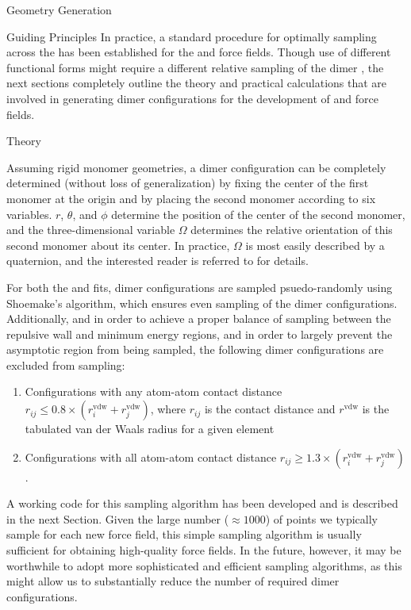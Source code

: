 \begin{section}{Geometry Generation}
\begin{subsection}{Guiding Principles}
In practice, a standard procedure for optimally sampling across the
\pes has been established for the \isaffold
and \mastiff force fields. Though use of different functional forms might
require a different relative sampling of the dimer \pes, the next sections completely outline the
theory and practical calculations that are involved in generating dimer
configurations for the development of \isaffold and \mastiff force fields.

\end{subsection}
\begin{subsection}{Theory}

Assuming rigid monomer geometries, a dimer configuration can be completely
determined (without loss of generalization) by fixing the center of the first monomer at the
origin and by placing the second monomer according to six variables. $r$, $\theta$, and $\phi$ determine the position
of the center of the second monomer, and the three-dimensional variable $\Omega$ determines the relative
orientation of this second monomer about its center. In practice, $\Omega$ is
most easily described by a quaternion, and the interested reader is referred
to  for details.

For both the \isaffold and \mastiff fits, dimer configurations are sampled
psuedo-randomly using Shoemake's algorithm,\cite{Shoemake1992} which ensures
even sampling of the dimer configurations. 
Additionally, and
in order to achieve a proper balance of sampling between the
repulsive wall and minimum energy regions, and in order to largely prevent
the asymptotic region from being sampled, the following dimer configurations
are excluded from sampling:
\begin{enumerate}
\item Configurations with any atom-atom contact distance 
$r_{ij} \le 0.8\times(r^{\text{vdw}}_i + r^{\text{vdw}}_j)$, where $r_{ij}$ is the
contact distance and $r^{\text{vdw}}$ is the tabulated van der Waals radius
for a given element
\item Configurations with all atom-atom contact distance 
$r_{ij} \ge 1.3\times(r^{\text{vdw}}_i + r^{\text{vdw}}_j)$.
\end{enumerate}
A working code for this sampling algorithm has been developed and is described
in the next Section.  Given the large number ($\approx 1000$) of points we
typically sample for each new force field, this simple sampling algorithm is
usually sufficient for obtaining high-quality force fields.  In the future,
however, it may be worthwhile to adopt more sophisticated and efficient
sampling algorithms, as this might allow us to substantially reduce the number
of required dimer configurations.\cite{Metz2016}



\end{subsection}
\end{section}
